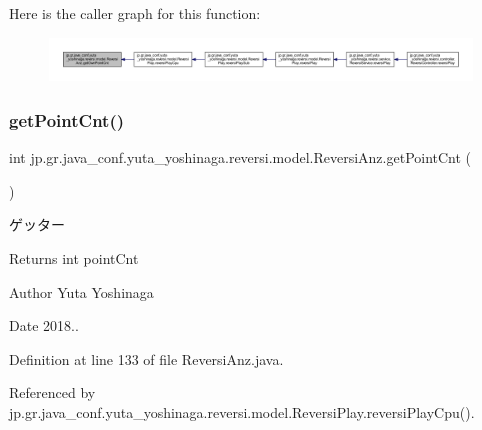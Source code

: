 Here is the caller graph for this function\+:
\nopagebreak
\begin{figure}[H]
\begin{center}
\leavevmode
\includegraphics[width=350pt]{classjp_1_1gr_1_1java__conf_1_1yuta__yoshinaga_1_1reversi_1_1model_1_1_reversi_anz_a3579aecd3696d9d48da7940422a03dc9_icgraph}
\end{center}
\end{figure}
\mbox{\label{classjp_1_1gr_1_1java__conf_1_1yuta__yoshinaga_1_1reversi_1_1model_1_1_reversi_anz_ad6a22ffbec6cd298d3943c437350e54c}} 
\subsubsection{\texorpdfstring{get\+Point\+Cnt()}{getPointCnt()}}
{\footnotesize\ttfamily int jp.\+gr.\+java\+\_\+conf.\+yuta\+\_\+yoshinaga.\+reversi.\+model.\+Reversi\+Anz.\+get\+Point\+Cnt (\begin{DoxyParamCaption}{ }\end{DoxyParamCaption})}



ゲッター 

\begin{DoxyReturn}{Returns}
int point\+Cnt 
\end{DoxyReturn}
\begin{DoxyAuthor}{Author}
Yuta Yoshinaga 
\end{DoxyAuthor}
\begin{DoxyDate}{Date}
2018.. 
\end{DoxyDate}


Definition at line 133 of file Reversi\+Anz.\+java.



Referenced by jp.\+gr.\+java\+\_\+conf.\+yuta\+\_\+yoshinaga.\+reversi.\+model.\+Reversi\+Play.\+reversi\+Play\+Cpu().

